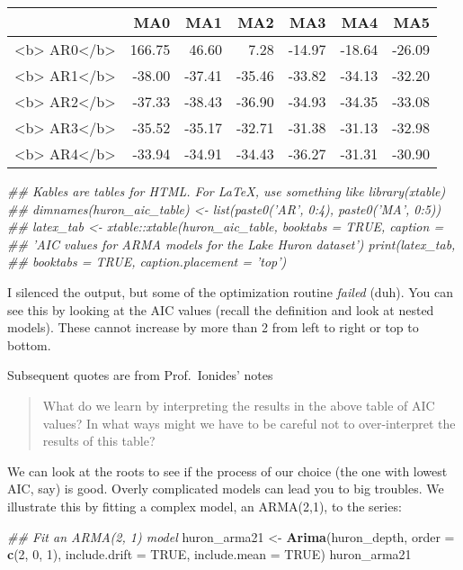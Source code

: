 \documentclass[]{book}
\newenvironment{Shaded}{\begin{snugshade}}{\end{snugshade}}
\newcommand{\CommentTok}[1]{\textcolor[rgb]{0.56,0.35,0.01}{\textit{#1}}}
\newcommand{\DataTypeTok}[1]{\textcolor[rgb]{0.13,0.29,0.53}{#1}}
\newcommand{\DecValTok}[1]{\textcolor[rgb]{0.00,0.00,0.81}{#1}}
\newcommand{\KeywordTok}[1]{\textcolor[rgb]{0.13,0.29,0.53}{\textbf{#1}}}
\newcommand{\NormalTok}[1]{#1}
\newcommand{\OtherTok}[1]{\textcolor[rgb]{0.56,0.35,0.01}{#1}}
\newcommand{\StringTok}[1]{\textcolor[rgb]{0.31,0.60,0.02}{#1}}
\begin{document}
\begin{tabular}{l|r|r|r|r|r|r}
\hline
  & MA0 & MA1 & MA2 & MA3 & MA4 & MA5\\
\hline
<b> AR0</b> & 166.75 & 46.60 & 7.28 & -14.97 & -18.64 & -26.09\\
\hline
<b> AR1</b> & -38.00 & -37.41 & -35.46 & -33.82 & -34.13 & -32.20\\
\hline
<b> AR2</b> & -37.33 & -38.43 & -36.90 & -34.93 & -34.35 & -33.08\\
\hline
<b> AR3</b> & -35.52 & -35.17 & -32.71 & -31.38 & -31.13 & -32.98\\
\hline
<b> AR4</b> & -33.94 & -34.91 & -34.43 & -36.27 & -31.31 & -30.90\\
\hline
\end{tabular}

\begin{Shaded}
\begin{Highlighting}[]
\CommentTok{## Kables are tables for HTML. For LaTeX, use something like library(xtable)}
\CommentTok{## dimnames(huron_aic_table) <- list(paste0('AR', 0:4), paste0('MA', 0:5))}
\CommentTok{## latex_tab <- xtable::xtable(huron_aic_table, booktabs = TRUE, caption =}
\CommentTok{## 'AIC values for ARMA models for the Lake Huron dataset') print(latex_tab,}
\CommentTok{## booktabs = TRUE, caption.placement = 'top')}
\end{Highlighting}
\end{Shaded}

I silenced the output, but some of the optimization routine \emph{failed} (duh). You can see this by looking at the AIC values (recall the definition and look at nested models). These cannot increase by more than 2 from left to right or top to bottom.

Subsequent quotes are from Prof.~Ionides' notes

\begin{quote}
What do we learn by interpreting the results in the above table of AIC values? In what ways might we have to be careful not to over-interpret the results of this table?
\end{quote}

We can look at the roots to see if the process of our choice (the one with lowest AIC, say) is good. Overly complicated models can lead you to big troubles. We illustrate this by fitting a complex model, an ARMA(2,1), to the series:

\begin{Shaded}
\begin{Highlighting}[]
\CommentTok{## Fit an ARMA(2, 1) model}
\NormalTok{huron_arma21 <-}\StringTok{ }\KeywordTok{Arima}\NormalTok{(huron_depth, }\DataTypeTok{order =} \KeywordTok{c}\NormalTok{(}\DecValTok{2}\NormalTok{, }\DecValTok{0}\NormalTok{, }\DecValTok{1}\NormalTok{), }\DataTypeTok{include.drift =} \OtherTok{TRUE}\NormalTok{, }
    \DataTypeTok{include.mean =} \OtherTok{TRUE}\NormalTok{)}
\NormalTok{huron_arma21}
\end{Highlighting}
\end{Shaded}
\end{document}
